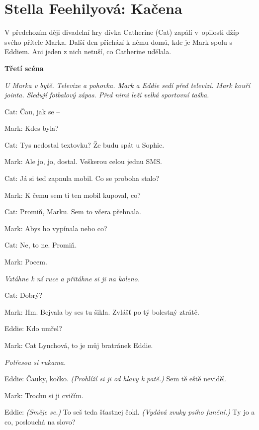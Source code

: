 \section{Stella Feehilyová: Kačena}

\noindent
V předchozím ději divadelní hry dívka Catherine (Cat) zapálí v~opilosti džíp svého přítele Marka. Další den přichází k němu domů, kde je Mark spolu s Eddiem. Ani jeden z nich netuší, co Catherine udělala.

\bigskip
\noindent
\textbf{Třetí scéna}

\bigskip
\noindent
\textit{U Marka v bytě. Televize a pohovka. Mark a Eddie sedí před televizí. Mark kouří jointa. Sledují fotbalový zápas. Před nimi leží velká sportovní taška.}

\medskip
\noindent
Cat: Čau, jak se --

\medskip
\noindent
Mark: Kdes byla?

\medskip
\noindent
Cat: Tys nedostal textovku? Že budu spát u Sophie.

\medskip
\noindent
Mark: Ale jo, jo, dostal. Veškerou celou jednu SMS.

\medskip
\noindent
Cat: Já si teď zapnula mobil. Co se proboha stalo?

\medskip
\noindent
Mark: K čemu sem ti ten mobil kupoval, co?

\medskip
\noindent
Cat: Promiň, Marku. Sem to včera přehnala.

\medskip
\noindent
Mark: Abys ho vypínala nebo co?

\medskip
\noindent
Cat: Ne, to ne. Promiň.

\medskip
\noindent
Mark: Pocem.

\medskip
\noindent
\textit{Vztáhne k ní ruce a přitáhne si ji na koleno.}

\medskip
\noindent
Cat: Dobrý?

\medskip
\noindent
Mark: Hm. Bejvala by ses tu šikla. Zvlášť po tý bolestný ztrátě.

\medskip
\noindent
Eddie: Kdo umřel?

\medskip
\noindent
Mark: Cat Lynchová, to je můj bratránek Eddie.

\medskip
\noindent
\textit{Potřesou si rukama.}

\medskip
\noindent
Eddie:	Čauky, kočko. \textit{(Prohlíží si ji od hlavy k patě.)} Sem tě eště neviděl.

\medskip
\noindent
Mark: Trochu si ji cvičím.

\medskip
\noindent
Eddie:	\textit{(Směje se.)} To seš teda šťastnej čokl. \textit{(Vydává zvuky psího funění.)} Ty jo a co, poslouchá na slovo?

